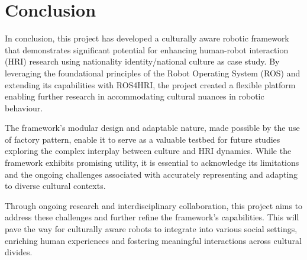 
\chapter{Conclusion}

In conclusion, this project has developed a culturally aware robotic framework that demonstrates significant potential for enhancing human-robot interaction (HRI) research using nationality identity/national culture as case study. By leveraging the foundational principles of the Robot Operating System (ROS) and extending its capabilities with ROS4HRI, the project created a flexible platform enabling further research in accommodating cultural nuances in robotic behaviour.

The framework's modular design and adaptable nature, made possible by the use of factory pattern, enable it to serve as a valuable testbed for future studies exploring the complex interplay between culture and HRI dynamics. While the framework exhibits promising utility, it is essential to acknowledge its limitations and the ongoing challenges associated with accurately representing and adapting to diverse cultural contexts.

Through ongoing research and interdisciplinary collaboration, this project aims to address these challenges and further refine the framework's capabilities. This will pave the way for culturally aware robots to integrate into various social settings, enriching human experiences and fostering meaningful interactions across cultural divides.


